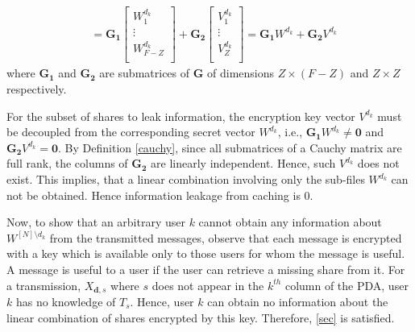 \documentclass[conference]{IEEEtran}
\begin{document}
	\begin{align}
	&=\mathbf{G_1}
	\begin{bmatrix}
	W^{d_k}_1\\
	\vdots\\
	W^{d_k}_{F-Z}\\
	\end{bmatrix}
	+ \mathbf{G_2}
	\begin{bmatrix}
	V^{d_k}_1\\
	\vdots\\
	V^{d_k}_Z\\
	\end{bmatrix}
	=\mathbf{G_1}W^{d_k}+\mathbf{G_2}V^{d_k}
	\end{align}
	where $\mathbf{G_1}$ and $\mathbf{G_2}$ are submatrices of $\mathbf{G}$ of dimensions $Z\times(F-Z)$ and $Z\times Z$ respectively.
	\par For the subset of shares to leak information, the encryption key vector $V^{d_k}$ must be decoupled from the corresponding secret vector $W^{d_k}$, i.e., $\mathbf{G_1}W^{d_k}\neq\mathbf{0}$ and $\mathbf{G_2}V^{d_k}=\mathbf{0}$. By Definition \ref{cauchy}, since all submatrices of a Cauchy matrix are full rank, the columns of $\mathbf{G_2}$ are linearly independent. Hence, such $V^{d_k}$ does not exist. This implies, that a linear combination involving only the sub-files $W^{d_k}$ can not be obtained. Hence information leakage from caching is 0.
\par Now, to show that an arbitrary user $k$ cannot obtain any information about $W^{[N]\setminus d_k}$ from the transmitted messages, observe that each message is encrypted with a key which is available only to those users for whom the message is useful. A message is useful to a user if the user can retrieve a missing share from it. For a transmission, $X_{\mathbf{d},s}$ where $s$ does not appear in the $k^{th}$ column of the PDA, user $k$ has no knowledge of $T_s$. Hence, user $k$ can obtain no information about the linear combination of shares encrypted by this key. Therefore, \eqref{sec} is satisfied.
\end{document}

